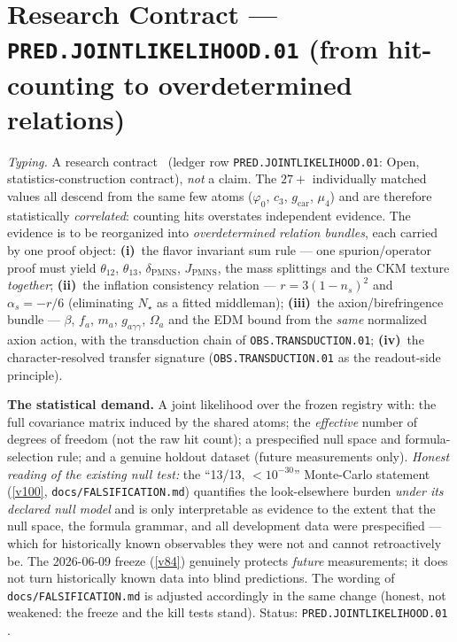 \documentclass[11pt,a4paper]{article}
\begin{document}
\section*{Research Contract --- \texttt{PRED.JOINTLIKELIHOOD.01} (from hit-counting to overdetermined relations)}
\noindent\emph{Typing.} A research contract \mO\ (ledger row \texttt{PRED.JOINTLIKELIHOOD.01}:
Open, statistics-construction contract), \emph{not} a claim.  The $27{+}$ individually matched
values all descend from the same few atoms ($\varphi_0$, $c_3$, $g_{\mathrm{car}}$, $\mu_4$) and
are therefore statistically \emph{correlated}: counting hits overstates independent evidence.
The evidence is to be reorganized into \emph{overdetermined relation bundles}, each carried by
one proof object:
\textbf{(i)}~the flavor invariant sum rule --- one spurion/operator proof must yield
$\theta_{12}$, $\theta_{13}$, $\delta_{\mathrm{PMNS}}$, $J_{\mathrm{PMNS}}$, the mass splittings
and the CKM texture \emph{together};
\textbf{(ii)}~the inflation consistency relation --- $r=3(1-n_s)^2$ and $\alpha_s=-r/6$
(eliminating $N_\star$ as a fitted middleman);
\textbf{(iii)}~the axion/birefringence bundle --- $\beta$, $f_a$, $m_a$, $g_{a\gamma\gamma}$,
$\Omega_a$ and the EDM bound from the \emph{same} normalized axion action, with the transduction
chain of \texttt{OBS.TRANSDUCTION.01};
\textbf{(iv)}~the character-resolved transfer signature (\texttt{OBS.TRANSDUCTION.01} as the
readout-side principle).

\par\smallskip\noindent\textbf{The statistical demand.}  A joint likelihood over the frozen
registry with: the full covariance matrix induced by the shared atoms; the \emph{effective}
number of degrees of freedom (not the raw hit count); a prespecified null space and
formula-selection rule; and a genuine holdout dataset (future measurements only).  \emph{Honest
reading of the existing null test:} the ``13/13, $<10^{-30}$'' Monte-Carlo statement (\vref{v100},
\texttt{docs/FALSIFICATION.md}) quantifies the look-elsewhere burden \emph{under its declared
null model} and is only interpretable as evidence to the extent that the null space, the formula
grammar, and all development data were prespecified --- which for historically known observables
they were not and cannot retroactively be.  The 2026-06-09 freeze (\vref{v84}) genuinely
protects \emph{future} measurements; it does not turn historically known data into blind
predictions.  The wording of \texttt{docs/FALSIFICATION.md} is adjusted accordingly in the same
change (honest, not weakened: the freeze and the kill tests stand).  Status:
\texttt{PRED.JOINTLIKELIHOOD.01} \mO.
\end{document}
